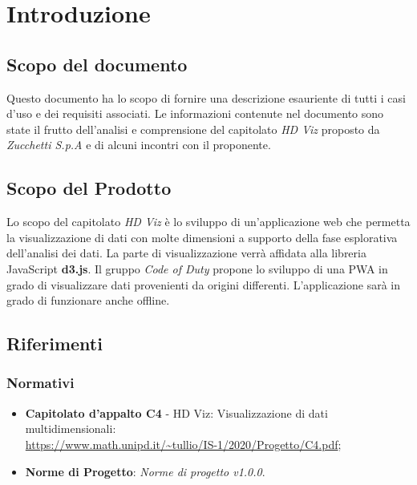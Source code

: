 \section{Introduzione}
    \subsection{Scopo del documento}
    Questo documento ha lo scopo di fornire una descrizione esauriente di tutti i casi d'uso e dei requisiti associati. Le informazioni contenute nel documento sono state il frutto dell'analisi e comprensione del capitolato \emph{HD Viz} proposto da \emph{Zucchetti S.p.A} e di alcuni incontri con il proponente.
    \subsection{Scopo del Prodotto}
    Lo scopo del capitolato \emph{HD Viz} è lo sviluppo di un'applicazione web che permetta la visualizzazione di dati con molte dimensioni a supporto della fase esplorativa dell'analisi dei dati. La parte di visualizzazione verrà affidata alla libreria JavaScript \textbf{d3.js}. Il gruppo \emph{Code of Duty} propone lo sviluppo di una PWA in grado di visualizzare dati provenienti da origini differenti. L'applicazione sarà in grado di funzionare anche offline.
    \subsection{Riferimenti}
    \subsubsection{Normativi}
    \begin{itemize}
        \item \textbf{Capitolato d'appalto C4} - HD Viz: Visualizzazione di dati multidimensionali:\\\url{https://www.math.unipd.it/~tullio/IS-1/2020/Progetto/C4.pdf};
        \item \textbf{Norme di Progetto}: \emph{Norme di progetto v1.0.0}.
    \end{itemize}
